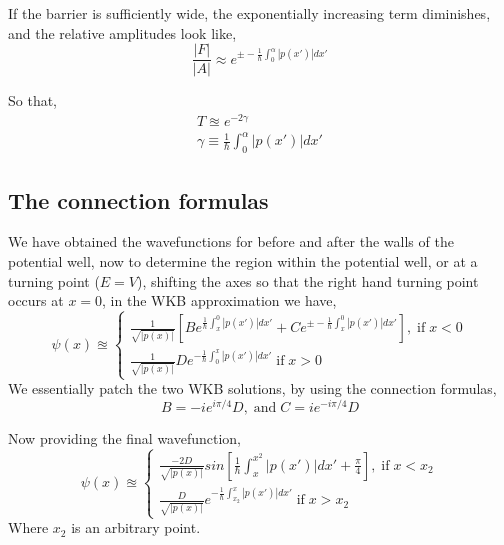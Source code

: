 If the barrier is sufficiently wide, the exponentially increasing term diminishes, and the relative amplitudes look like,
\begin{equation*}
	\frac{|F|}{|A|}\approx e^{\pm -\frac{1}{\hbar}\int_{0}^{\alpha} |p(x')|dx'}
\end{equation*}

So that,
\begin{gather}
	T\approxeq e^{-2\gamma}\\
	\gamma\equiv \frac{1}{\hbar}\int_{0}^{\alpha} |p(x')|dx'
\end{gather}


\subsection{The connection formulas}
We have obtained the wavefunctions for before and after the walls of the potential well, now to determine the region within the potential well, or at a turning point ($E=V$), shifting the axes so that the right hand turning point occurs at $x=0$, in the WKB approximation we have,
\begin{equation}
	\psi(x)\approxeq
	\begin{cases}
		\frac{1}{\sqrt{|p(x)|}}\left[Be^{ \frac{1}{\hbar}\int_{x}^{0} |p(x')|dx'} +Ce^{\pm -\frac{1}{\hbar}\int_{x}^{0} |p(x')|dx'}\right], \; \text{if}\; x<0 \\
		
		\frac{1}{\sqrt{|p(x)|}}De^{-\frac{1}{\hbar}\int_{0}^{x}|p(x')|dx'} \; \text{if} \; x>0
	\end{cases}
\end{equation}
We essentially patch the two WKB solutions, by using the connection formulas,
\begin{equation}
	B=-ie^{i\pi/4}D, \; \text{and}\; C=ie^{-i\pi/4}D
\end{equation}

Now providing the final wavefunction,
\begin{equation}
	\psi(x)\approxeq
	\begin{cases}
		\frac{-2D}{\sqrt{|p(x)|}}sin\left[ \frac{1}{\hbar}\int_{x}^{x^2} |p(x')|dx'+\frac{\pi}{4}\right],\; \text{if}\; x<x_2\\
		
		\frac{D}{\sqrt{|p(x)|}}e^{-\frac{1}{\hbar}\int_{x_2}^{x}|p(x')|dx'} \; \text{if} \; x>x_2
	\end{cases}
\end{equation}
Where $x_2$ is an arbitrary point.

